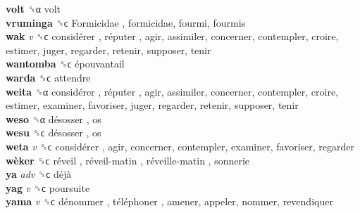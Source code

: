 \textbf{volt} ␝α  volt  \\
\textbf{vruminga} ␝ϲ   Formicidae , formicidae, fourmi, fourmis  \\
\textbf{wak} \emph{v}  ␝ϲ   considérer ,  réputer , agir, assimiler, concerner, contempler, croire, estimer, juger, regarder, retenir, supposer, tenir  \\
\textbf{wantomba} ␝ϲ   épouvantail   \\
\textbf{warda} ␝ϲ  attendre  \\
\textbf{weita} ␝α   considérer ,  réputer , agir, assimiler, concerner, contempler, croire, estimer, examiner, favoriser, juger, regarder, retenir, supposer, tenir  \\
\textbf{weso} ␝α   désosser , os  \\
\textbf{wesu} ␝ϲ   désosser , os  \\
\textbf{weta} \emph{v}  ␝ϲ   considérer , agir, concerner, contempler, examiner, favoriser, regarder  \\
\textbf{wèker} ␝ϲ   réveil ,  réveil-matin ,  réveille-matin , sonnerie  \\
\textbf{ya} \emph{adv}  ␝ϲ   déjà   \\
\textbf{yag} \emph{v}  ␝ϲ  poursuite  \\
\textbf{yama} \emph{v}  ␝ϲ   dénommer ,  téléphoner , amener, appeler, nommer, revendiquer  \\
